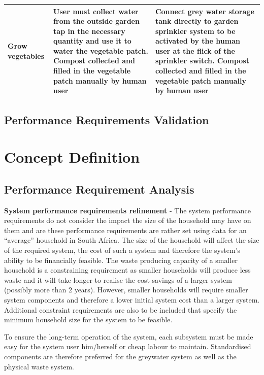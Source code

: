 \documentclass[a4paper,11pt,fleqn]{report}
\begin{document}
\begin{center}
\begin{longtable}{p{3.5cm}|p{5.5cm}|p{5.5cm}}
    \hline
     Grow vegetables & User must collect water from the outside garden tap in the necessary quantity and use it to water the vegetable patch. Compost collected and filled in the vegetable patch manually by human user & Connect grey water storage tank directly to garden sprinkler system to be activated by the human user at the flick of the sprinkler switch. Compost collected and filled in the vegetable patch manually by human user\\
    \hline
    \bottomrule
\end{longtable}
\end{center}
%
	
\subsection{Performance Requirements Validation}

\section{Concept Definition}
\subsection{Performance Requirement Analysis}
\textbf{System performance requirements refinement} - The system performance requirements do not consider the impact the size of the household may have on them and are these performance requirements are rather set using data for an “average” household in South Africa. The size of the household will affect the size of the required system, the cost of such a system and therefore the system’s ability to be financially feasible. The waste producing capacity of a smaller household is a constraining requirement as smaller households will produce less waste and it will take longer to realise the cost savings of a larger system (possibly more than 2 years). However, smaller households will require smaller system components and therefore a lower initial system cost than a larger system. Additional constraint requirements are also to be included that specify the minimum household size for the system to be feasible.

To ensure the long-term operation of the system, each subsystem must be made easy for the system user him/herself or cheap labour to maintain. Standardised components are therefore preferred for the greywater system as well as the physical waste system. \\
\end{document}
